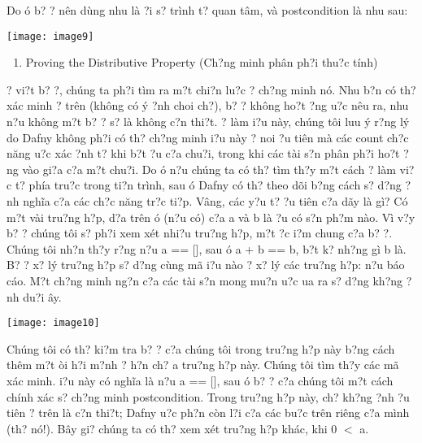 \documentclass{article} %
\begin{document}
Do {\dj}\'{o} b? {\dj}? n\^{e}n d\`{u}ng nhu l\`{a} {\dj}?i s? tr\`{i}nh t? quan t\^{a}m, v\`{a} postcondition l\`{a} nhu sau:

\noindent \texttt{[image: image9]}

\noindent 

\begin{enumerate}
\item  Proving the Distributive Property (Ch?ng minh ph\^{a}n ph?i thu?c t\'{i}nh)
\end{enumerate}

{\DJ}? vi?t b? {\dj}?, ch\'{u}ng ta ph?i t\`{i}m ra m?t chi?n lu?c {\dj}? ch?ng minh n\'{o}. Nhu b?n c\'{o} th? x\'{a}c minh ? tr\^{e}n (kh\^{o}ng c\'{o} \'{y} {\dj}?nh choi ch?), b? {\dj}? kh\^{o}ng ho?t {\dj}?ng {\dj}u?c n\^{e}u ra, nhu n?u kh\^{o}ng m?t b? {\dj}? s? l\`{a} kh\^{o}ng c?n thi?t. {\DJ}? l\`{a}m {\dj}i?u n\`{a}y, ch\'{u}ng t\^{o}i luu \'{y} r?ng l\'{y} do Dafny kh\^{o}ng ph?i c\'{o} th? ch?ng minh {\dj}i?u n\`{a}y ? noi {\dj}?u ti\^{e}n m\`{a} c\'{a}c count ch?c n\u{a}ng {\dj}u?c x\'{a}c {\dj}?nh t? khi b?t {\dj}?u c?a chu?i, trong khi c\'{a}c t\`{a}i s?n ph\^{a}n ph?i ho?t {\dj}?ng v\`{a}o gi?a c?a m?t chu?i. Do {\dj}\'{o} n?u ch\'{u}ng ta c\'{o} th? t\`{i}m th?y m?t c\'{a}ch {\dj}? l\`{a}m vi?c t? ph\'{i}a tru?c trong ti?n tr\`{i}nh, sau {\dj}\'{o} Dafny c\'{o} th? theo d\~{o}i b?ng c\'{a}ch s? d?ng {\dj}?nh ngh\~{i}a c?a c\'{a}c ch?c n\u{a}ng tr?c ti?p. V\^{a}ng, c\'{a}c y?u t? {\dj}?u ti\^{e}n c?a d\~{a}y l\`{a} g\`{i}? C\'{o} m?t v\`{a}i tru?ng h?p, d?a tr\^{e}n {\dj}\'{o} (n?u c\'{o}) c?a a v\`{a} b l\`{a} {\dj}?u c\'{o} s?n ph?m n\`{a}o. V\`{i} v?y b? {\dj}? ch\'{u}ng t\^{o}i s? ph?i xem x\'{e}t nhi?u tru?ng h?p, m?t {\dj}?c {\dj}i?m chung c?a b? {\dj}?. Ch\'{u}ng t\^{o}i nh?n th?y r?ng n?u a == [], sau {\dj}\'{o} a + b == b, b?t k? nh?ng g\`{i} b l\`{a}. B? {\dj}? x? l\'{y} tru?ng h?p s? d?ng c\`{u}ng m\~{a} {\dj}i?u n\`{a}o {\dj}? x? l\'{y} c\'{a}c tru?ng h?p: n?u b\'{a}o c\'{a}o. M?t ch?ng minh ng?n c?a c\'{a}c t\`{a}i s?n mong mu?n {\dj}u?c {\dj}ua ra s? d?ng kh?ng {\dj}?nh du?i {\dj}\^{a}y.

\noindent \texttt{[image: image10]}

Ch\'{u}ng t\^{o}i c\'{o} th? ki?m tra b? {\dj}? c?a ch\'{u}ng t\^{o}i trong tru?ng h?p n\`{a}y b?ng c\'{a}ch th\^{e}m m?t {\dj}\`{o}i h?i m?nh {\dj}? h?n ch? a tru?ng h?p n\`{a}y. Ch\'{u}ng t\^{o}i t\`{i}m th?y c\'{a}c m\~{a} x\'{a}c minh. {\DJ}i?u n\`{a}y c\'{o} ngh\~{i}a l\`{a} n?u a == [], sau {\dj}\'{o} b? {\dj}? c?a ch\'{u}ng t\^{o}i m?t c\'{a}ch ch\'{i}nh x\'{a}c s? ch?ng minh postcondition. Trong tru?ng h?p n\`{a}y, ch? kh?ng {\dj}?nh {\dj}?u ti\^{e}n ? tr\^{e}n l\`{a} c?n thi?t; Dafny {\dj}u?c ph?n c\`{o}n l?i c?a c\'{a}c bu?c tr\^{e}n ri\^{e}ng c?a m\`{i}nh (th? n\'{o}!). B\^{a}y gi? ch\'{u}ng ta c\'{o} th? xem x\'{e}t tru?ng h?p kh\'{a}c, khi 0 $<$ {\textbar}a{\textbar}. 
\end{document}
